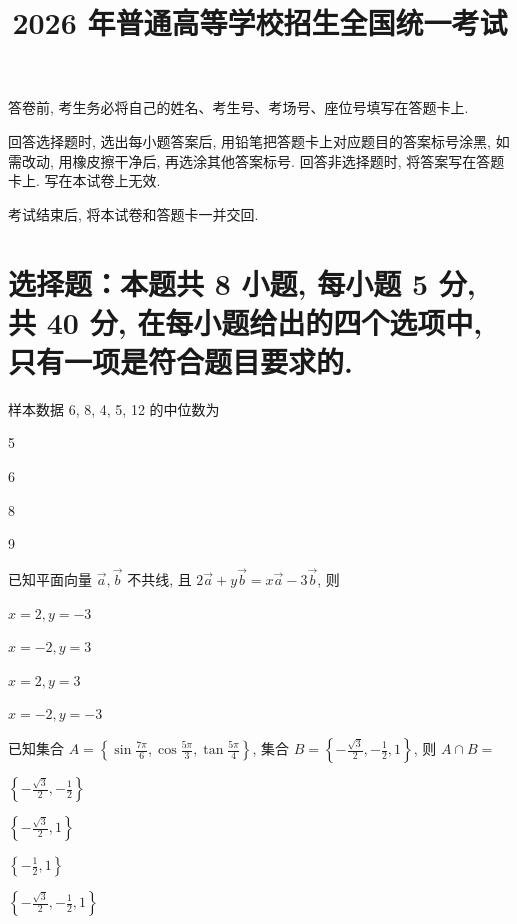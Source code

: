 \documentclass{exam-zh}
\title{2026 年普通高等学校招生全国统一考试}
\begin{document}
\secret

\maketitle

\begin{notice}
\item 答卷前, 考生务必将自己的姓名、考生号、考场号、座位号填写在答题卡上.
\item 回答选择题时, 选出每小题答案后, 用铅笔把答题卡上对应题目的答案标号涂黑,
  如需改动, 用橡皮擦干净后, 再选涂其他答案标号.
  回答非选择题时, 将答案写在答题卡上. 写在本试卷上无效.
\item 考试结束后, 将本试卷和答题卡一并交回.
\end{notice}

\section{选择题：本题共 8 小题, 每小题 5 分, 共 40 分, 在每小题给出的四个选项中, 只有一项是符合题目要求的. }
\begin{question} %
  样本数据 6, 8, 4, 5, 12 的中位数为 \paren
  \begin{choices}
  \item 5
  \item 6
  \item 8
  \item 9
  \end{choices}
\end{question}

\begin{question} %
  已知平面向量 $\vec{a}, \vec{b}$ 不共线, 且 $2 \vec{a} + y \vec{b} = x \vec{a}
  - 3 \vec{b}$, 则 \paren
  \begin{choices}
  \item $x=2, y=-3$
  \item $x=-2, y=3$
  \item $x=2, y=3$
  \item $x=-2, y=-3$
  \end{choices}
\end{question}

\begin{question} %
  已知集合
  $A=\left\{\sin\frac{7\pi}{6},\cos\frac{5\pi}{3},\tan\frac{5\pi}{4}\right\}$,
  集合 $B=\left\{-\frac{\sqrt{3}}{2},-\frac{1}{2},1\right\}$, 则 $A\cap B=$ \paren
  \begin{choices}
  \item $\left\{-\frac{\sqrt{3}}{2},-\frac{1}{2}\right\}$
  \item $\left\{-\frac{\sqrt{3}}{2}, 1\right\}$
  \item $\left\{-\frac{1}{2}, 1\right\}$
  \item $\left\{-\frac{\sqrt{3}}{2},-\frac{1}{2}, 1\right\}$
  \end{choices}
\end{question}
\end{document}
